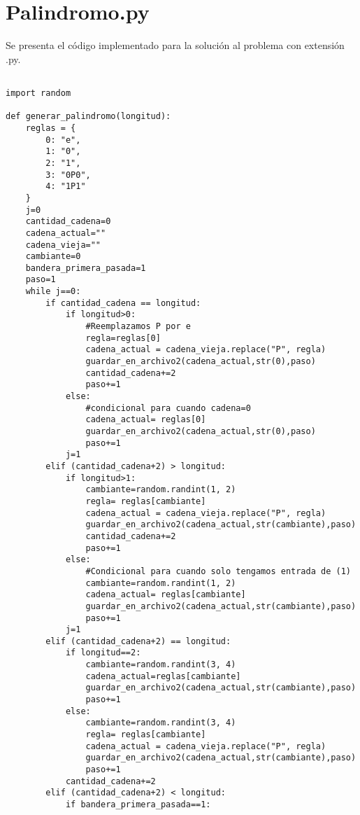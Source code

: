 \section{Palindromo.py}
Se presenta el código implementado para la solución al problema con extensión .py.\newline
\\
\begin{lstlisting}

import random

def generar_palindromo(longitud):
    reglas = {
        0: "e",
        1: "0",
        2: "1",
        3: "0P0",
        4: "1P1"
    }
    j=0
    cantidad_cadena=0
    cadena_actual=""
    cadena_vieja=""
    cambiante=0
    bandera_primera_pasada=1
    paso=1
    while j==0:
        if cantidad_cadena == longitud:
            if longitud>0:
                #Reemplazamos P por e
                regla=reglas[0]
                cadena_actual = cadena_vieja.replace("P", regla)
                guardar_en_archivo2(cadena_actual,str(0),paso)
                cantidad_cadena+=2
                paso+=1
            else:
                #condicional para cuando cadena=0
                cadena_actual= reglas[0]
                guardar_en_archivo2(cadena_actual,str(0),paso)
                paso+=1
            j=1
        elif (cantidad_cadena+2) > longitud:
            if longitud>1:
                cambiante=random.randint(1, 2)
                regla= reglas[cambiante] 
                cadena_actual = cadena_vieja.replace("P", regla)
                guardar_en_archivo2(cadena_actual,str(cambiante),paso)
                cantidad_cadena+=2
                paso+=1
            else:
                #Condicional para cuando solo tengamos entrada de (1)
                cambiante=random.randint(1, 2)
                cadena_actual= reglas[cambiante]
                guardar_en_archivo2(cadena_actual,str(cambiante),paso)
                paso+=1
            j=1
        elif (cantidad_cadena+2) == longitud:
            if longitud==2:
                cambiante=random.randint(3, 4)
                cadena_actual=reglas[cambiante]
                guardar_en_archivo2(cadena_actual,str(cambiante),paso)
                paso+=1
            else:
                cambiante=random.randint(3, 4)
                regla= reglas[cambiante]
                cadena_actual = cadena_vieja.replace("P", regla)
                guardar_en_archivo2(cadena_actual,str(cambiante),paso)
                paso+=1
            cantidad_cadena+=2
        elif (cantidad_cadena+2) < longitud:
            if bandera_primera_pasada==1:

\end{lstlisting}
